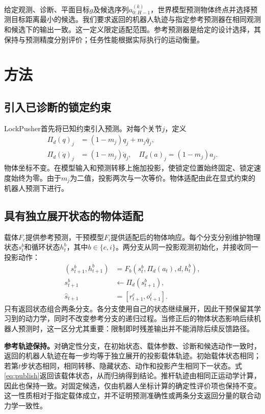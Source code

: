 \documentclass[UTF8,a4paper,10pt,twocolumn]{ctexart}
\begin{document}
给定观测、诊断、平面目标$g$及候选序列$a^{(k)}_{0:H-1}$，世界模型预测物体终点并选择预测目标距离最小的候选。我们要求返回的机器人轨迹与指定参考预测器在相同观测和候选下的输出一致。这一定义限定适配范围。参考预测器是给定的设计选择，其保持与预测精度分别评价；任务性能根据实际执行的运动衡量。

\section{方法}
\subsection{引入已诊断的锁定约束}
LockPusher首先将已知约束引入预测。对每个关节$j$，定义
\begin{align}
\Pi_d(q)_j&=(1-m_j)q_j+m_j\bar q_j,\\
\Pi_d(\dot q)_j&=(1-m_j)\dot q_j,\quad\Pi_d(a)_j=(1-m_j)a_j.
\end{align}
物体坐标不变。在模型输入和预测转移上施加投影，使锁定位置始终固定、锁定速度始终为零。由于$m_j$为二值，投影两次与一次等价。物体适配由此在显式约束的机器人预测下进行。

\subsection{具有独立展开状态的物体适配}
载体$F_c$提供参考预测，干预模型$F_i$提供适配后的物体响应。每个分支分别维护物理状态$s^b_t$和循环状态$h^b_t$，其中$b\in\{c,i\}$。两分支从同一投影观测初始化，并接收同一投影动作：
\begin{align}
(s^b_{t+1},h^b_{t+1})&=F_b(s^b_t,\Pi_d(a_t),d,h^b_t),\\
s^b_{t+1}&\leftarrow\Pi_d(s^b_{t+1}),\\
\hat s_{t+1}&=[r^c_{t+1},o^i_{t+1}].\label{eq:publish}
\end{align}
只有返回状态组合两条分支。各分支使用自己的状态继续展开，因此干预保留其学习到的动力学，同时不改变参考分支的递归过程。当修正后的物体状态影响后续机器人预测时，这一区分尤其重要：限制即时残差输出并不能消除后续反馈路径。

\textbf{参考轨迹保持。}对确定性分支，在初始状态、载体参数、诊断和候选动作一致时，返回的机器人轨迹在每一步均等于独立展开的投影载体轨迹。初始载体状态相同；若第$t$步状态相同，相同转移、隐藏状态、动作和投影产生相同下一状态。式\eqref{eq:publish}返回该载体状态，从而归纳得到结论。推杆轨迹由相同正运动学计算，因此也保持一致。对固定候选，仅由机器人坐标计算的确定性评价项也保持不变。这一性质相对于指定载体成立，并不证明预测准确性或两条分支返回分量的联合动力学一致性。
\end{document}
